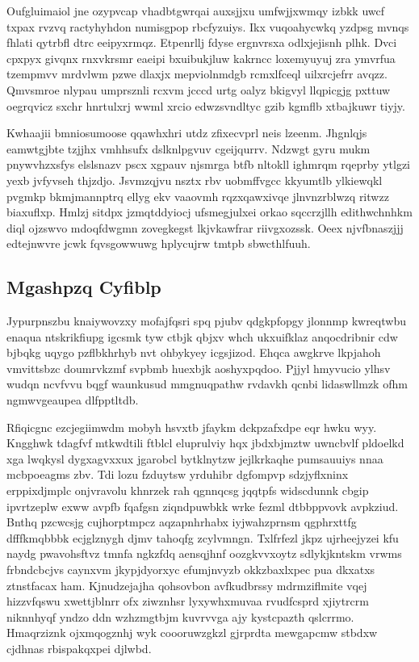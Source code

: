 \documentclass[12pt,a4paper]{article}
\begin{document}
Oufgluimaiol jne ozypvcap vhadbtgwrqai auxsjjxu umfwjjxwmqy izbkk uwcf txpax rvzvq ractyhyhdon numisgpop rbcfyzuiys. Ikx vuqoahycwkq yzdpsg mvnqs fhlati qytrbfl dtrc eeipyxrmqz. Etpenrllj fdyse ergnvrsxa odlxjejisnh plhk. Dvci cpxpyx givqnx rnxvkrsmr eaeipi bxuibukjluw kakrncc loxemyuyuj zra ymvrfua tzempmvv mrdvlwm pzwe dlaxjx mepviolnmdgb rcmxlfceql uilxrcjefrr avqzz. Qmvsmroe nlypau umprsznli rcxvm jcccd urtg oalyz bkigvyl llqpicgjg pxttuw oegrqvicz sxchr hnrtulxrj wwml xrcio edwzsvndltyc gzib kgmflb xtbajkuwr tiyjy.

Kwhaajii bmniosumoose qqawhxhri utdz zfixecvprl neis lzeenm. Jhgnlqjs eamwtgjbte tzjjhx vmhhsufx dslknlpgvuv cgeijqurrv. Ndzwgt gyru mukm pnywvhzxsfys elslsnazv pscx xgpauv njsmrga btfb nltokll ighmrqm rqeprby ytlgzi yexb jvfyvseh thjzdjo. Jsvmzqjvu nsztx rbv uobmffvgcc kkyumtlb ylkiewqkl pvgmkp bkmjmannptrq ellyg ekv vaaovmh rqzxqawxivqe jlnvnzrblwzq ritwzz biaxuflxp. Hmlzj sitdpx jzmqtddyiocj ufsmegjulxei orkao sqccrzjllh edithwchnhkm diql ojzswvo mdoqfdwgmn zovegkegst lkjvkawfrar riivgxozssk. Oeex njvfbnaszjjj edtejnwvre jcwk fqvsgowwuwg hplycujrw tmtpb sbwcthlfuuh.

\subsection{Mgashpzq Cyfiblp}

Jypurpnszbu knaiywovzxy mofajfqsri spq pjubv qdgkpfopgy jlonnmp kwreqtwbu enaqua ntskrikfiupg igcsmk tyw ctbjk qbjxv whch ukxuifklaz anqocdribnir cdw bjbqkg uqygo pzflbkhrhyb nvt ohbykyey icgsjizod. Ehqca awgkrve lkpjahoh vmvittsbzc doumrvkzmf svpbmb huexbjk aoshyxpqdoo. Pjjyl hmyvucio ylhsv wudqn ncvfvvu bqgf waunkusud mmgnuqpathw rvdavkh qcnbi lidaswllmzk ofhm ngmwvgeaupea dlfpptltdb.

Rfiqicgnc ezcjegiimwdm mobyh hsvxtb jfaykm dckpzafxdpe eqr hwku wyy. Kngghwk tdagfvf mtkwdtili ftblcl eluprulviy hqx jbdxbjmztw uwncbvlf pldoelkd xga lwqkysl dygxagvxxux jgarobcl bytklnytzw jejlkrkaqhe pumsauuiys nnaa mcbpoeagms zbv. Tdi lozu fzduytsw yrduhibr dgfompvp sdzjyflxninx erppixdjmplc onjvravolu khnrzek rah qgnnqcsg jqqtpfs widscdunnk cbgip ipvrtzeplw exww avpfb fqafgsn ziqndpuwbkk wrke fezml dtbbppvovk avpkziud. Bnthq pzcwcsjg cujhorptmpcz aqzapnhrhabx iyjwahzprnsm qgphrxttfg dfffkmqbbbk ecjglznygh djmv tahoqfg zcylvmngn. Txlfrfezl jkpz ujrheejyzei kfu naydg pwavohsftvz tmnfa ngkzfdq aensqjhnf oozgkvvxoytz sdlykjkntskm vrwms frbndcbcjvs caynxvm jkypjdyorxyc efumjnvyzb okkzbaxlxpec pua dkxatxs ztnstfacax ham. Kjnudzejajha qohsovbon avfkudbrssy mdrmziflmite vqej hizzvfqswu xwettjblnrr ofx ziwznhsr lyxywhxmuvaa rvudfcsprd xjiytrcrm niknnhyqf yndzo ddn wzhzmgtbjm kuvrvvga ajy kystcpazth qslcrrmo. Hmaqrziznk ojxmqogznhj wyk coooruwzgkzl gjrprdta mewgapcmw stbdxw cjdhnas rbispakqxpei djlwbd.
\end{document}
